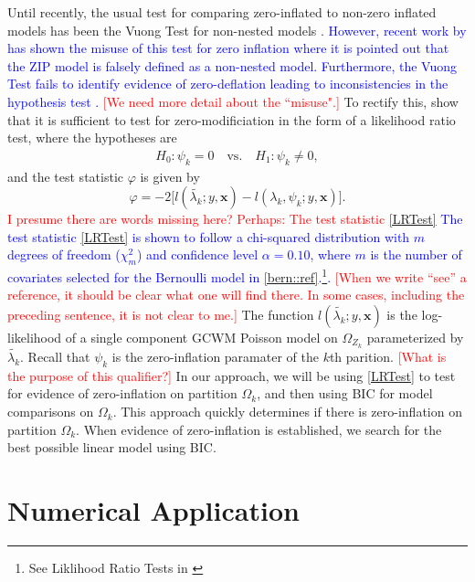 \documentclass[11pt,letterpaper]{article}
\numberwithin{equation}{section}
\numberwithin{equation}{section}
\numberwithin{equation}{section}
\begin{document}
Until recently, the usual test for comparing zero-inflated to non-zero inflated models has been the Vuong Test for non-nested models \citep{vuongTest}. \textcolor{blue}{However, recent work by \cite[see][]{misuse} has shown the misuse of this test for zero inflation where it is pointed out that the ZIP model is falsely defined as a non-nested model. Furthermore, the Vuong Test fails to identify evidence of zero-deflation leading to inconsistencies in the hypothesis test \citep[see][]{misuse}.}  \textcolor{red}{[We need more detail about the ``misuse".]} To rectify this, \cite{newIntuitive} show that it is sufficient to test for zero-modificiation in the form of a likelihood ratio test, where the hypotheses are
\begin{align*}
& & H_0: \psi_k = 0 \quad \text{vs.} \quad H_1: \psi_k \neq 0, & &
\end{align*}
and the test statistic $\varphi$ is given by
\begin{equation}
\varphi = -2 \big[l(\tilde{\lambda_k}; y, \bm{x}) - l(\lambda_k, \psi_k; y , \bm{x} )\big].
\label{LRTest}
\end{equation}
\textcolor{red}{I presume there are words missing here? Perhaps: The test statistic \eqref{LRTest}} \textcolor{blue}{The test statistic \eqref{LRTest} is shown to follow a chi-squared distribution with $m$ degrees of freedom ($\chi^2_m $) and confidence level $\alpha = 0.10$, where $m$ is the number of covariates selected for the Bernoulli model in \eqref{bern::ref}.\footnote{See Liklihood Ratio Tests in  \cite{newIntuitive}}. } \textcolor{red}{[When we write ``see'' a reference, it should be clear what one will find there. In some cases, including the preceding sentence, it is not clear to me.]} The function 
$l(\tilde{\lambda_k}; y , \bm{x})$ is the log-likelihood of a single component GCWM Poisson model on $\Omega_{Z_k}$ parameterized by $\tilde{\lambda_k}$. Recall that $\psi_k$ is the zero-inflation paramater of the $k$th parition.  \textcolor{red}{[What is the purpose of this qualifier?]} In our approach, we will be using \eqref{LRTest} to  test for evidence of zero-inflation on partition $\Omega_k$, and then using BIC for model comparisons on $\Omega_k$. This approach quickly determines if there is zero-inflation on partition $\Omega_k$.  When evidence of zero-inflation is established, we search for the best possible linear model using BIC. 

\section{Numerical Application}\label{sec:numapp}
\end{document}
